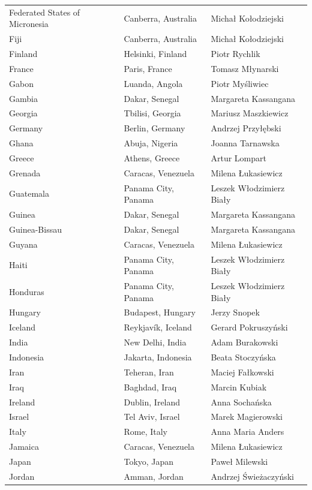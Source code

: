 \documentclass{article}
\begin{document}
\begin{tabular}{lll}
Federated States of Micronesia & Canberra, Australia & Michał Kołodziejski \\
Fiji & Canberra, Australia & Michał Kołodziejski \\
Finland & Helsinki, Finland & Piotr Rychlik \\
France & Paris, France & Tomasz Młynarski \\
Gabon & Luanda, Angola & Piotr Myśliwiec \\
Gambia & Dakar, Senegal & Margareta Kassangana \\
Georgia & Tbilisi, Georgia & Mariusz Maszkiewicz \\
Germany & Berlin, Germany & Andrzej Przyłębski \\
Ghana & Abuja, Nigeria & Joanna Tarnawska \\
Greece & Athens, Greece & Artur Lompart \\
Grenada & Caracas, Venezuela & Milena Łukasiewicz \\
Guatemala & Panama City, Panama & Leszek Włodzimierz Biały \\
Guinea & Dakar, Senegal & Margareta Kassangana \\
Guinea-Bissau & Dakar, Senegal & Margareta Kassangana \\
Guyana & Caracas, Venezuela & Milena Łukasiewicz \\
Haiti & Panama City, Panama & Leszek Włodzimierz Biały \\
Honduras & Panama City, Panama & Leszek Włodzimierz Biały \\
Hungary & Budapest, Hungary & Jerzy Snopek \\
Iceland & Reykjavík, Iceland & Gerard Pokruszyński \\
India & New Delhi, India & Adam Burakowski \\
Indonesia & Jakarta, Indonesia & Beata Stoczyńska \\
Iran & Teheran, Iran & Maciej Fałkowski \\
Iraq & Baghdad, Iraq & Marcin Kubiak \\
Ireland & Dublin, Ireland & Anna Sochańska \\
Israel & Tel Aviv, Israel & Marek Magierowski \\
Italy & Rome, Italy & Anna Maria Anders \\
Jamaica & Caracas, Venezuela & Milena Łukasiewicz \\
Japan & Tokyo, Japan & Paweł Milewski \\
Jordan & Amman, Jordan & Andrzej Świeżaczyński \\

\end{tabular}
\end{document}
